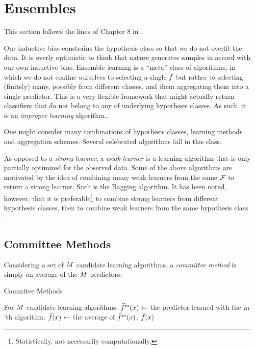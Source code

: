 \section{Ensembles}
\label{sec:ensembles}

This section follows the lines of Chapter 8 in \cite{hastie_elements_2003}.

Our inductive bias constrains the hypothesis class so that we do not overfit the data. 
It is overly optimistic to think that nature generates samples in accord with our own inductive bias.
Ensemble learning is a ``meta'' class of algorithms, in which we do not confine ourselves to selecting a single $f$ but rather to selecting (finitely) many, possibly from different classes, and them aggregating them into a single predictor.
This is a very flexible framework that might actually return classifiers that do not belong to any of underlying hypothesis classes. As such, it is an \emph{improper learning} algorithm..

One might consider many combinations of hypothesis classes, learning methods and aggregation schemes.
Several celebrated algorithms fall in this class. 



\begin{remark}
As opposed to a \emph{strong learner}, a \emph{weak learner} is a learning algorithm that is only partially optimized for the observed data. 
Some of the above algorithms are motivated by the idea of combining many weak learners from the same $\mathcal{F}$ to return a strong learner. 
Such is the Bagging algorithm. 
It has been noted, however, that it is preferable\footnote{Statistically, not necessarily computationally.}  to combine strong learners from different hypothesis classes, then to combine weak learners from the same hypothesis class \cite{gashler_decision_2008}.
\end{remark}




\subsection{Committee Methods}
Considering a set of $M$ candidate learning algorithms, a \emph{committee method} is simply an average of the $M$ predictors:

\begin{algorithm}[H]
\caption{Commitee Methods}
\label{algo:committee}
\begin{algorithmic}
\State For $M$ candidate learning algorithms.
	\State $\widehat{f}^m(x) \gets$ the predictor learned with the $m$'th algorithm.
\EndFor
\State $\bar{f}(x) \gets$ the average of $\widehat{f}^m(x)$. 
\State \Return $\bar{f}(x)$
\end{algorithmic}
\end{algorithm}

